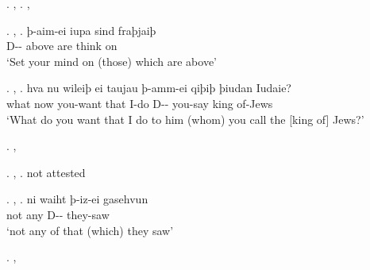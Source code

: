 \ex. , 
\ex. , 

\ex. , 
\ag. þ-aim-ei iupa sind fraþjaiþ\\
 D-- above are {think on}\\
 `Set your mind on (those) which are above'

\ex. , 
\ag. hva nu wileiþ ei taujau þ-amm-ei qiþiþ þiudan Iudaie?\\
what now you-want that I-do D-- you-say king of-Jews\\
`What do you want that I do to him (whom) you call the [king of] Jews?'

\ex. , 

\ex. , 
\a. not attested

\ex. , 
\ag. ni waiht þ-iz-ei gasehvun\\
 not any D-- they-saw\\
 `not any of that (which) they saw'


\ex. , 

